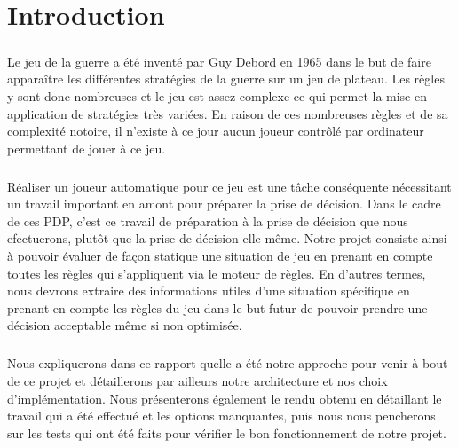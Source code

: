 
\chapter{Introduction}


	\paragraph{}
	Le jeu de la guerre a été inventé par Guy Debord en 1965 dans le but de faire apparaître les différentes stratégies de la guerre sur un jeu de plateau. 
	Les règles y sont donc nombreuses et le jeu est assez complexe ce qui permet la mise en application de stratégies très variées.
	En raison de ces nombreuses règles et de sa complexité notoire, il n'existe à ce jour aucun joueur contrôlé par ordinateur permettant de jouer à ce jeu.
	
	\paragraph{}
	Réaliser un joueur automatique pour ce jeu est une tâche conséquente nécessitant un travail important en amont pour préparer la prise de décision.
	Dans le cadre de ces PDP, c'est ce travail de préparation à la prise de décision que nous efectuerons, plutôt que la prise de décision elle même.
	Notre projet consiste ainsi à pouvoir évaluer de façon statique une situation de jeu en prenant en compte toutes les règles qui s'appliquent via le moteur de règles.
	En d'autres termes, nous devrons extraire des informations utiles d'une situation spécifique en prenant en compte les règles du jeu dans le but futur de pouvoir prendre une décision acceptable même si non optimisée.
	
	\paragraph{}
	Nous expliquerons dans ce rapport quelle a été notre approche pour venir à bout de ce projet et détaillerons par ailleurs notre architecture et nos
	choix d'implémentation. Nous présenterons également le rendu obtenu en détaillant le travail qui a été effectué et les options manquantes, puis
	nous nous pencherons sur les tests qui ont été faits pour vérifier le bon fonctionnement de notre projet.